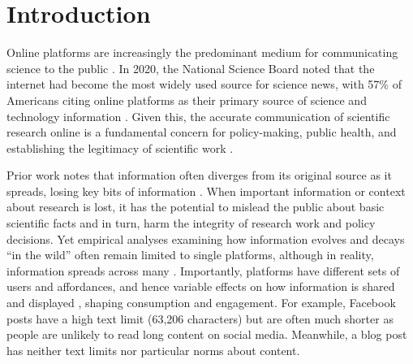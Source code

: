 \documentclass[letterpaper]{article} %
\begin{document}
\section{Introduction}
Online platforms are increasingly the predominant medium for communicating science to the public \citep{suScienceNewsConsumption2015}. In 2020, the National Science Board noted that the internet had become the most widely used source for science news, with 57\% of Americans citing online platforms as their primary source of science and technology information %
\citep{nationalscienceboardScienceTechnologyPublic2020}. Given this, the accurate communication of scientific research online is a fundamental concern for policy-making, public health, and establishing the legitimacy of scientific work \cite{jamiesonSignalingTrustworthinessScience2019}.

Prior work notes that information often diverges from its original source as it spreads, losing key bits of information \citep{ribeiroMessageDistortionInformation2019,tanLostPropagationUnfolding2016}. When important information or context about research is lost, it has the potential to mislead the public about basic scientific facts and in turn, harm the integrity of research work and policy decisions. Yet empirical analyses examining how information evolves and decays ``in the wild'' often remain limited to single platforms, although in reality, information spreads across many \cite{hillStudyingPopulationsOnline2019,andersonTeensSocialMedia2018}. Importantly, platforms have different sets of users \cite{horvatBirdsFeatherFlock2021} and affordances, and hence variable effects on how information is shared and displayed \cite{malikIdentifyingPlatformEffects2016}, shaping consumption and engagement. For example, Facebook posts have a high text limit (63,206 characters) but are often much shorter as people are unlikely to read long content on social media. Meanwhile, a blog post has neither text limits nor particular norms about content.%
\end{document}
